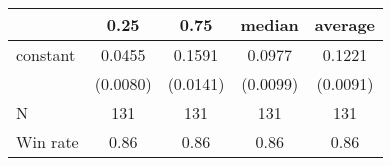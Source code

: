 \begin{tabular}{lcccc}
\hline
         &   0.25   &   0.75   &  median  & average   \\
\midrule
\midrule
constant & 0.0455   & 0.1591   & 0.0977   & 0.1221    \\
         & (0.0080) & (0.0141) & (0.0099) & (0.0091)  \\
N        & 131      & 131      & 131      & 131       \\
Win rate & 0.86     & 0.86     & 0.86     & 0.86      \\
\hline
\end{tabular}